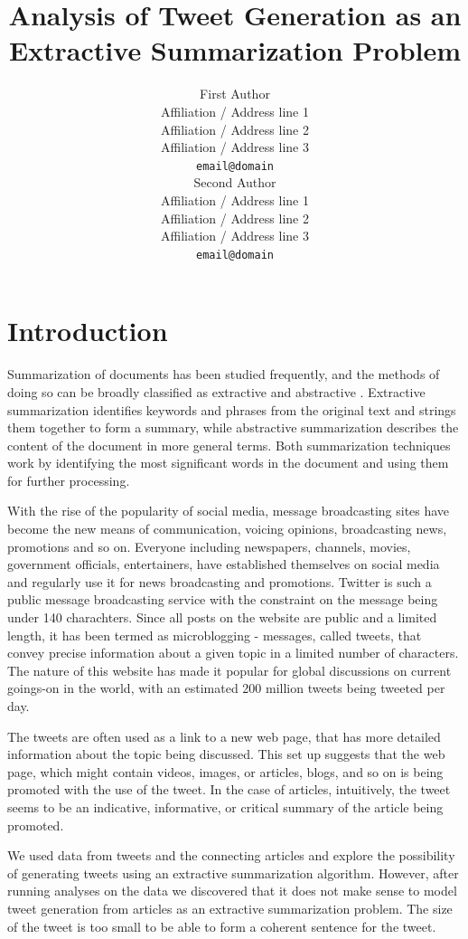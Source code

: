 \documentclass[11pt]{article}
\title{Analysis of Tweet Generation as an Extractive Summarization Problem}
\author{First Author \\
  Affiliation / Address line 1 \\
  Affiliation / Address line 2 \\
  Affiliation / Address line 3 \\
  {\tt email@domain} \\\And
  Second Author \\
  Affiliation / Address line 1 \\
  Affiliation / Address line 2 \\
  Affiliation / Address line 3 \\
  {\tt email@domain} \\}
\date{}
\begin{document}
\maketitle
\begin{abstract}
\end{abstract}


\section{Introduction}

Summarization of documents has been studied frequently, and the methods of doing so can be broadly classified as extractive and abstractive \cite{hahn2000challenges}. Extractive summarization identifies keywords and phrases from the original text and strings them together to form a summary, while abstractive summarization describes the content of the document in more general terms. Both summarization techniques work by identifying the most significant words in the document and using them for further processing. 

With the rise of the popularity of social media, message broadcasting sites have become the new means of communication, voicing opinions, broadcasting news, promotions and so on. Everyone including newspapers, channels, movies, government officials, entertainers, have established themselves on social media and regularly use it for news broadcasting and promotions. Twitter is such a public message broadcasting service with the constraint on the message being under 140 charachters. Since all posts on the website are public and a limited length, it has been termed as microblogging - messages, called tweets, that convey precise information about a given topic in a limited number of characters. The nature of this website has made it popular for global discussions on current goings-on in the world, with an estimated 200 million tweets being tweeted per day.

The tweets are often used as a link to a new web page, that has more detailed information about the topic being discussed. This set up suggests that the web page, which might contain videos, images, or articles, blogs, and so on is being promoted with the use of the tweet. In the case of articles, intuitively, the tweet seems to be an indicative, informative, or critical summary of the article being promoted. 

We used data from tweets and the connecting articles and explore the possibility of generating tweets using an extractive summarization algorithm. However, after running analyses on the data we discovered that it does not make sense to model tweet generation from articles as an extractive summarization problem. The size of the tweet is too small to be able to form a coherent sentence for the tweet. 
\end{document}
